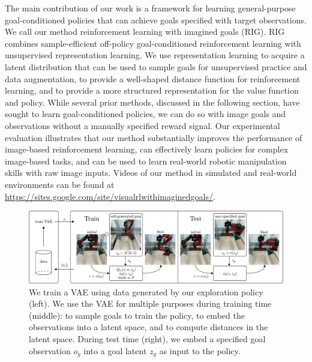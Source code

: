 \documentclass{article}
\begin{document}
The main contribution of our work is a framework for learning general-purpose goal-conditioned policies that can achieve goals specified with target observations.
We call our method reinforcement learning with imagined goals (RIG).
RIG combines sample-efficient off-policy goal-conditioned reinforcement learning with unsupervised representation learning.
We use representation learning to acquire a latent distribution that can be used to sample goals for unsupervised practice and data augmentation, to provide a well-shaped distance function for reinforcement learning, and to provide a more structured representation for the value function and policy.
While several prior methods, discussed in the following section, have sought to learn goal-conditioned policies, we can do so with image goals and observations without a manually specified reward signal.
Our experimental evaluation illustrates that our method substantially improves the performance of image-based reinforcement learning, can effectively learn policies for complex image-based tasks, and can be used to learn real-world robotic manipulation skills with raw image inputs. Videos of our method in simulated and real-world environments can be found at \url{https://sites.google.com/site/visualrlwithimaginedgoals/}.

\begin{figure}
    \centering
    \includegraphics[width=\linewidth]{img/fig1-min-crop.pdf}
    \caption{We train a VAE using data generated by our exploration policy (left). We use the VAE for multiple purposes during training time (middle): to sample goals to train the policy, to embed the observations into a latent space, and to compute distances in the latent space. During test time (right), we embed a specified goal observation $o_g$ into a goal latent $z_g$ as input to the policy.}
    \vspace{-0.1in}
    \label{fig:fig1}
\end{figure}
\end{document}
